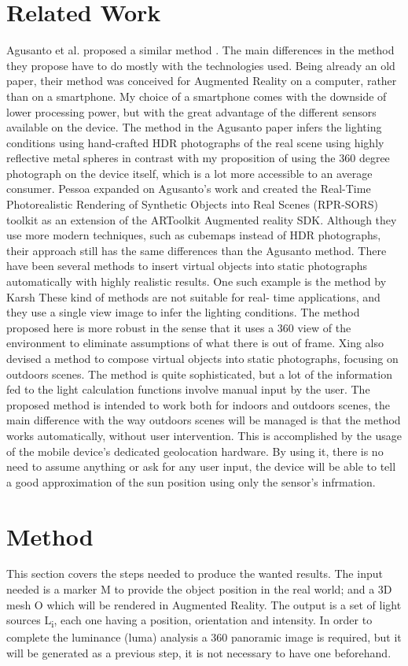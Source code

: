 \documentclass{article}
\begin{document}
\section{Related Work}
Agusanto et al. proposed a similar method \cite{agusanto2003}. The main differences in the method they propose have to do mostly with the technologies used. Being already an old paper, their method was conceived for Augmented Reality on a computer, rather than on a smartphone. My choice of a smartphone comes with the downside of lower processing power, but with the great advantage of the different sensors available on the device. The method in the Agusanto paper infers the lighting conditions using hand-crafted HDR photographs of the real scene using highly reflective metal spheres in contrast with my proposition of using the 360 degree photograph on the device itself, which is a lot more accessible to an average consumer.
Pessoa\cite{pessoa2011} expanded on Agusanto's work and created the Real-Time Photorealistic Rendering of Synthetic Objects into Real Scenes (RPR-SORS) toolkit as an extension of the ARToolkit Augmented reality SDK. Although they use more modern techniques, such as cubemaps instead of HDR photographs, their approach still has the same differences than the Agusanto method.
There have been several methods to insert virtual objects into static photographs automatically with highly realistic results. One such example is the method by Karsh \cite{karsh2014} These kind of methods are not suitable for real- time applications, and they use a single view image to infer the lighting conditions. The method proposed here is more robust in the sense that it uses a 360 view of the environment to eliminate assumptions of what there is out of frame.
Xing\cite{xing2013} also devised a method to compose virtual objects into static photographs, focusing on outdoors scenes. The method is quite sophisticated, but a lot of the information fed to the light calculation functions involve manual input by the user. The proposed method is intended to work both for indoors and outdoors scenes, the main difference with the way outdoors scenes will be managed is that the method works automatically, without user intervention. This is accomplished by the usage of the mobile device's dedicated geolocation hardware. By using it, there is no need to assume anything or ask for any user input, the device will be able to tell a good approximation of the sun position using only the sensor's infrmation.
\section{Method}
This section covers the steps needed to produce the wanted results. The input needed is a marker M to provide the object position in the real world; and a 3D mesh O which will be rendered in Augmented Reality. The output is a set of light sources L\textsubscript{i}, each one having a position, orientation and intensity. In order to complete the luminance (luma) analysis a 360 panoramic image is required, but it will be generated as a previous step, it is not necessary to have one beforehand.
\end{document}
